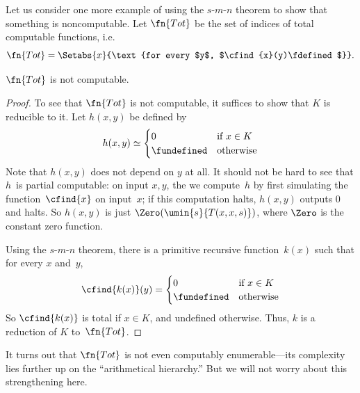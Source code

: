 \documentclass[../../../include/open-logic-section]{subfiles}
\begin{document}

Let us consider one more example of using the $s$-$m$-$n$ theorem to show
that something is noncomputable. Let $\fn{Tot}$ be the set of indices
of total computable functions, i.e.
\[
\fn{Tot} = \Setabs{x}{\text{for every $y$, $\cfind{x}(y)\fdefined$}}.
\]

\begin{prop}
$\fn{Tot}$ is not computable.
\end{prop}

\begin{proof}
To see that $\fn{Tot}$ is not computable, it suffices to show that $K$
is reducible to it. Let $h(x,y)$ be defined by
\[
h(x,y) \simeq
\begin{cases}
0 & \text{if $x \in K$} \\
\fundefined & \text{otherwise}
\end{cases}
\]
Note that $h(x,y)$ does not depend on $y$ at all. It should
not be hard to see that $h$~is partial computable: on input $x, y$, the
we compute~$h$ by first simulating the function~$\cfind{x}$ on input~$x$; if
this computation halts, $h(x,y)$ outputs $0$ and halts. So
$h(x,y)$ is just $\Zero(\umin{s}{T(x,x,s)})$, where $\Zero$ is the constant zero
function.

Using the $s$-$m$-$n$ theorem, there is a primitive recursive
function~$k(x)$ such that for every $x$ and~$y$,
\[
\cfind{k(x)}(y) =
\begin{cases}
0 & \text{if $x \in K$} \\
\fundefined & \text{otherwise}
\end{cases}
\]
So $\cfind{k(x)}$ is total if $x \in K$, and undefined otherwise. Thus,
$k$ is a reduction of $K$ to~$\fn{Tot}$.
\end{proof}

\begin{digress}
It turns out that $\fn{Tot}$ is not even computably enumerable---its
complexity lies further up on the ``arithmetical hierarchy.''  But we
will not worry about this strengthening here.
\end{digress}
\end{document}
